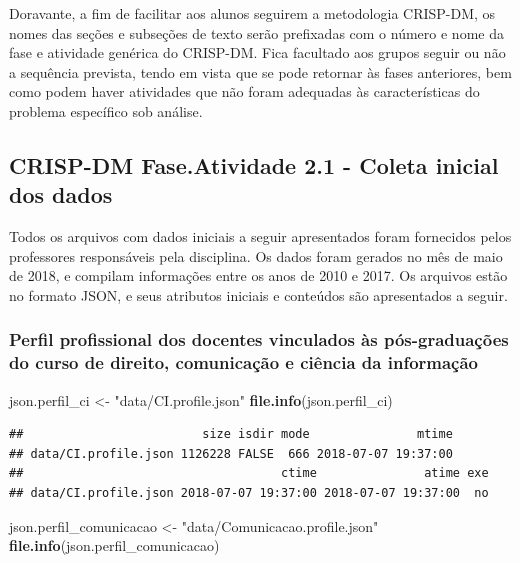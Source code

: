 \documentclass[]{article}
\newenvironment{Shaded}{\begin{snugshade}}{\end{snugshade}}
\newcommand{\KeywordTok}[1]{\textcolor[rgb]{0.13,0.29,0.53}{\textbf{#1}}}
\newcommand{\StringTok}[1]{\textcolor[rgb]{0.31,0.60,0.02}{#1}}
\newcommand{\NormalTok}[1]{#1}
\begin{document}
Doravante, a fim de facilitar aos alunos seguirem a metodologia
CRISP-DM, os nomes das seções e subseções de texto serão prefixadas com
o número e nome da fase e atividade genérica do CRISP-DM. Fica facultado
aos grupos seguir ou não a sequência prevista, tendo em vista que se
pode retornar às fases anteriores, bem como podem haver atividades que
não foram adequadas às características do problema específico sob
análise.

\subsection{CRISP-DM Fase.Atividade 2.1 - Coleta inicial dos
dados}\label{crisp-dm-fase.atividade-2.1---coleta-inicial-dos-dados}

Todos os arquivos com dados iniciais a seguir apresentados foram
fornecidos pelos professores responsáveis pela disciplina. Os dados
foram gerados no mês de maio de 2018, e compilam informações entre os
anos de 2010 e 2017. Os arquivos estão no formato JSON, e seus atributos
iniciais e conteúdos são apresentados a seguir.

\subsubsection{Perfil profissional dos docentes vinculados às
pós-graduações do curso de direito, comunicação e ciência da
informação}\label{perfil-profissional-dos-docentes-vinculados-as-pos-graduacoes-do-curso-de-direito-comunicacao-e-ciencia-da-informacao}

\begin{Shaded}
\begin{Highlighting}[]
\NormalTok{json.perfil_ci <-}\StringTok{ "data/CI.profile.json"}
\KeywordTok{file.info}\NormalTok{(json.perfil_ci)}
\end{Highlighting}
\end{Shaded}

\begin{verbatim}
##                         size isdir mode               mtime
## data/CI.profile.json 1126228 FALSE  666 2018-07-07 19:37:00
##                                    ctime               atime exe
## data/CI.profile.json 2018-07-07 19:37:00 2018-07-07 19:37:00  no
\end{verbatim}

\begin{Shaded}
\begin{Highlighting}[]
\NormalTok{json.perfil_comunicacao <-}\StringTok{ "data/Comunicacao.profile.json"}
\KeywordTok{file.info}\NormalTok{(json.perfil_comunicacao)}
\end{Highlighting}
\end{Shaded}
\end{document}

